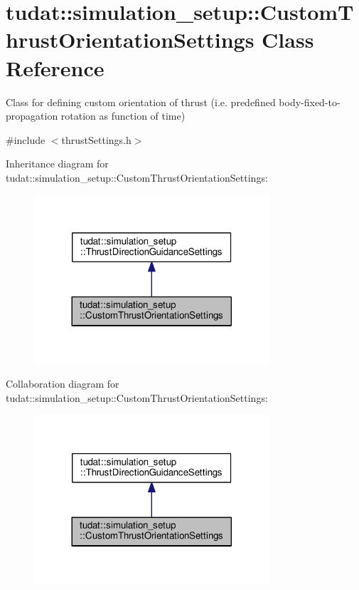 \hypertarget{classtudat_1_1simulation__setup_1_1CustomThrustOrientationSettings}{}\section{tudat\+:\+:simulation\+\_\+setup\+:\+:Custom\+Thrust\+Orientation\+Settings Class Reference}
\label{classtudat_1_1simulation__setup_1_1CustomThrustOrientationSettings}


Class for defining custom orientation of thrust (i.\+e. predefined body-\/fixed-\/to-\/propagation rotation as function of time)  




{\ttfamily \#include $<$thrust\+Settings.\+h$>$}



Inheritance diagram for tudat\+:\+:simulation\+\_\+setup\+:\+:Custom\+Thrust\+Orientation\+Settings\+:
\nopagebreak
\begin{figure}[H]
\begin{center}
\leavevmode
\includegraphics[width=248pt]{classtudat_1_1simulation__setup_1_1CustomThrustOrientationSettings__inherit__graph}
\end{center}
\end{figure}


Collaboration diagram for tudat\+:\+:simulation\+\_\+setup\+:\+:Custom\+Thrust\+Orientation\+Settings\+:
\nopagebreak
\begin{figure}[H]
\begin{center}
\leavevmode
\includegraphics[width=248pt]{classtudat_1_1simulation__setup_1_1CustomThrustOrientationSettings__coll__graph}
\end{center}
\end{figure}
